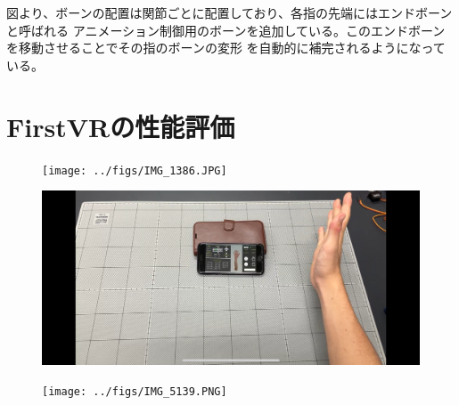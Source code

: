 \documentclass{ltjsreport}
\begin{document}
		図より、ボーンの配置は関節ごとに配置しており、各指の先端にはエンドボーンと呼ばれる
		アニメーション制御用のボーンを追加している。このエンドボーンを移動させることでその指のボーンの変形
		を自動的に補完されるようになっている。

	\section{}
		

	\section{FirstVRの性能評価}

		\begin{figure}[H]
		\centering
		\texttt{[image: ../figs/IMG\_1386.JPG]}
		\caption{}
		\label{}
		\end{figure}

		\begin{figure}[H]
		\centering
		\begin{minipage}{0.4\columnwidth}
		\centering
		\includegraphics[width = \columnwidth]{../figs/IMG_5138.PNG}
		\end{minipage}
		\hspace{0.04\columnwidth}
		\begin{minipage}{0.4\columnwidth}
		\centering
		\texttt{[image: ../figs/IMG\_5139.PNG]}
		\end{minipage}
		\caption{}
		\end{figure}
		
\end{document}
